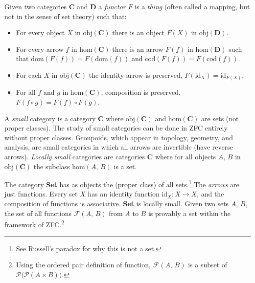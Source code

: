\documentclass{article}
\theoremstyle{plain}
\theoremstyle{normal}
\newenvironment{example}{%
    \pushQED{\qed}\renewcommand{\qedsymbol}{$\blacksquare$}\examplex%
}{%
    \popQED\endexamplex%
}
\begin{document}
            Given two categories $\mathbf{C}$ and $\mathbf{D}$ a
            \textit{functor} $F$ is a \textit{thing} (often called a mapping,
            but not in the sense of set theory) such that:%
            \begin{itemize}
                \item For every object $X$ in $\textrm{obj}(\mathbf{C})$
                    there is an object $F(X)$ in $\textrm{obj}(\mathbf{D})$.
                \item For every arrow $f$ in $\textrm{hom}(\mathbf{C})$ there
                    is an arrow $F(f)$ in $\textrm{hom}(\mathbf{D})$ such that
                    $\textrm{dom}(F(f))=F(\textrm{dom}(f))$ and
                    $\textrm{cod}(F(f))=F(\textrm{cod}(f))$.
                \item For each $X$ in $\textrm{obj}(\mathbf{C})$ the
                    identity arrow is preserved,
                    $F(\textrm{id}_{X})=\textrm{id}_{F(X)}$.
                \item For all $f$ and $g$ in $\textrm{hom}(\mathbf{C})$,
                    composition is preserved, $F(f\circ{g})=F(f)\circ{F}(g)$.
            \end{itemize}
            A \textit{small} category%
            is a category $\mathbf{C}$ where
            $\textrm{obj}(\mathbf{C})$ and $\textrm{hom}(\mathbf{C})$ are sets
            (not proper classes). The study of small categories can be done in
            ZFC entirely without proper classes. Groupoids, which appear in
            topology, geometry, and analysis, are small categories in which all
            arrows are invertible (have reverse arrows).
            \textit{Locally small} categories are categories $\mathbf{C}$ where
            for all objects $A,\,B$ in $\textrm{obj}(\mathbf{C})$ the
            subclass $\textrm{hom}(A,\,B)$ is a set.%
            \begin{example}
                The category \textbf{Set} has as objects the (proper class) of
                all sets.\footnote{%
                    See Russell's paradox for why this is not a set.%
                }
                The \textit{arrows} are just functions. Every set $X$ has an
                identity function $\textrm{id}_{X}:X\rightarrow{X}$, and the
                composition of functions is associative. \textbf{Set} is
                locally small. Given two sets $A,\,B$, the set of all functions
                $\mathcal{F}(A,\,B)$ from $A$ to $B$ is provably a set within
                the framework of ZFC.\footnote{%
                    Using the ordered pair definition of function,
                    $\mathcal{F}(A,\,B)$ is a
                    subset of $\mathcal{P}\big(\mathcal{P}(A\times{B})\big)$.
                }
            \end{example}
\end{document}
